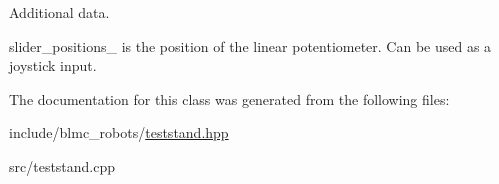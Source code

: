 Additional data. 

slider\+\_\+positions\+\_\+ is the position of the linear potentiometer. Can be used as a joystick input. 

The documentation for this class was generated from the following files\+:\begin{DoxyCompactItemize}
\item 
include/blmc\+\_\+robots/\hyperlink{teststand_8hpp}{teststand.\+hpp}\item 
src/teststand.\+cpp\end{DoxyCompactItemize}
